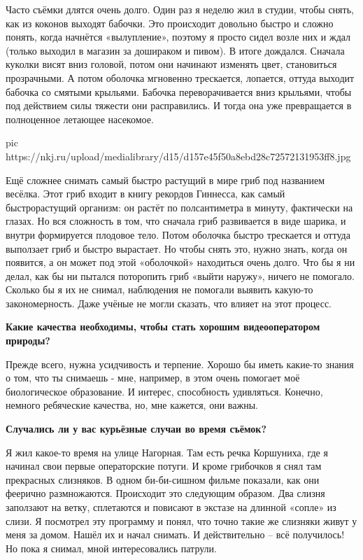 Часто съёмки длятся очень долго. Один раз я неделю жил в студии, чтобы снять,
как из коконов выходят бабочки. Это происходит довольно быстро и сложно понять,
когда начнётся «вылупление», поэтому я просто сидел возле них и ждал (только
выходил в магазин за дошираком и пивом). В итоге дождался. Сначала куколки
висят вниз головой, потом они начинают изменять цвет, становиться прозрачными.
А потом оболочка мгновенно трескается, лопается, оттуда выходит бабочка со
смятыми крыльями. Бабочка переворачивается вниз крыльями, чтобы под действием
силы тяжести они расправились. И тогда она уже превращается в полноценное
летающее насекомое. 

\ifcmt
pic https://nkj.ru/upload/medialibrary/d15/d157e45f50a8ebd28c72572131953ff8.jpg
\fi

Ещё сложнее снимать самый быстро растущий в мире гриб под названием весёлка.
Этот гриб входит в книгу рекордов Гиннесса, как самый быстрорастущий организм:
он растёт по полсантиметра в минуту, фактически на глазах. Но вся сложность в
том, что сначала гриб развивается в виде шарика, и внутри формируется плодовое
тело. Потом оболочка быстро трескается и оттуда выползает гриб и быстро
вырастает. Но чтобы снять это, нужно знать, когда он появится, а он может под
этой «оболочкой» находиться очень долго. Что бы я ни делал, как бы ни пытался
поторопить гриб «выйти наружу», ничего не помогало. Сколько бы я их не снимал,
наблюдения не помогали выявить какую-то закономерность. Даже учёные не могли
сказать, что влияет на этот процесс.

\textbf{Какие качества необходимы, чтобы стать хорошим видеооператором природы?}

Прежде всего, нужна усидчивость и терпение. Хорошо бы иметь какие-то знания о
том, что ты снимаешь - мне, например, в этом очень помогает моё биологическое
образование. И интерес, способность удивляться. Конечно, немного ребяческие
качества, но, мне кажется, они важны. 

\textbf{Случались ли у вас курьёзные случаи во время съёмок?}

Я жил какое-то время на улице Нагорная. Там есть речка Коршуниха, где я начинал
свои первые операторские потуги. И кроме грибочков я снял там прекрасных
слизняков. В одном би-би-сишном фильме показали, как они феерично размножаются.
Происходит это следующим образом. Два слизня заползают на ветку, сплетаются и
повисают в экстазе на длинной «сопле» из слизи. Я посмотрел эту программу и
понял, что точно такие же слизняки живут у меня за домом. Нашёл их и начал
снимать. И действительно – всё получилось! Но пока я снимал, мной
интересовались патрули. 

